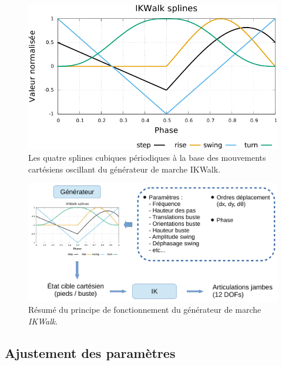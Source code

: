\begin{figure}[htb]
    \begin{center}
        \includegraphics[type=pdf,ext=.pdf,read=.pdf,width=0.95\linewidth]{../plot/walk_splines}
        \caption{\label{fig:walk_splines} 
            Les quatre splines cubiques périodiques à la base des mouvements 
            cartésiens oscillant du générateur de marche IKWalk.}
    \end{center}
\end{figure}

\begin{figure}[htb]
    \begin{center}
        \includegraphics[type=pdf,ext=.pdf,read=.pdf,width=1.0\linewidth]{../schema/ikwalk}
        \caption{\label{fig:walk_schema} 
            Résumé du principe de fonctionnement du générateur de marche
            \textit{IKWalk}.
        }
    \end{center}
\end{figure}

\subsection{Ajustement des paramètres}

